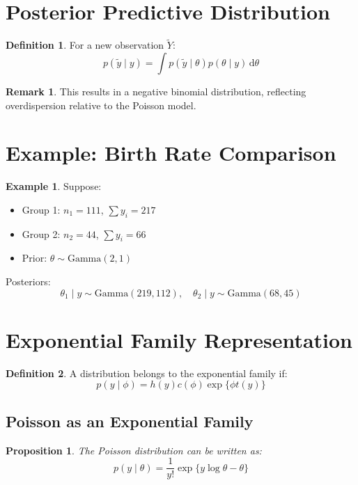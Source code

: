 \documentclass[12pt,oneside]{book}
\numberwithin{equation}{section}
\theoremstyle{definition}
\newtheorem{definition}{Definition}[section]
\newtheorem{example}{Example}[section]
\newtheorem{remark}{Remark}[section]
\theoremstyle{plain}
\newtheorem{proposition}{Proposition}[section]
\theoremstyle{remark}
\newcommand{\dd}{\,\mathrm{d}}
\newcommand{\Gam}{\mathrm{Gamma}}
\begin{document}
\section{Posterior Predictive Distribution}

\begin{definition}
For a new observation $\tilde{Y}$:
$$
p(\tilde{y} \mid y)
=
\int p(\tilde{y} \mid \theta)p(\theta \mid y)\dd \theta
$$
\end{definition}

\begin{remark}
This results in a negative binomial distribution, reflecting overdispersion relative to the Poisson model.
\end{remark}

\section{Example: Birth Rate Comparison}

\begin{example}
Suppose:
\begin{itemize}
\item Group 1: $n_1=111$, $\sum y_i = 217$
\item Group 2: $n_2=44$, $\sum y_i = 66$
\item Prior: $\theta \sim \Gam(2,1)$
\end{itemize}

Posteriors:
$$
\theta_1 \mid y \sim \Gam(219,112), \quad
\theta_2 \mid y \sim \Gam(68,45)
$$
\end{example}

\section{Exponential Family Representation}

\begin{definition}
A distribution belongs to the exponential family if:
$$
p(y \mid \phi) = h(y)c(\phi)\exp\{\phi t(y)\}
$$
\end{definition}

\subsection{Poisson as an Exponential Family}

\begin{proposition}
The Poisson distribution can be written as:
$$
p(y \mid \theta)
= \frac{1}{y!}\exp\{y\log \theta - \theta\}
$$
\end{proposition}
\end{document}
